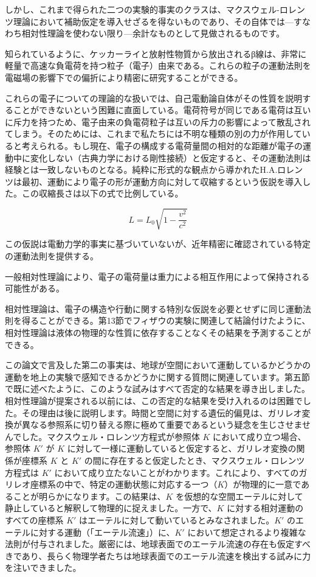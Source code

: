 \documentclass[a4paper,11pt,openany]{ltjsbook}
\begin{document}
しかし、これまで得られた二つの実験的事実のクラスは、マクスウェル-ロレンツ理論において補助仮定を導入せざるを得ないものであり、その自体では—すなわち相対性理論を使わない限り—余計なものとして見做されるものです。

知られているように、ケッカーライと放射性物質から放出されるβ線は、非常に軽量で高速な負電荷を持つ粒子（電子）由来である。これらの粒子の運動法則を電磁場の影響下での偏折により精密に研究することができる。

これらの電子についての理論的な扱いでは、自己電動論自体がその性質を説明することができないという困難に直面している。電荷符号が同じである電荷は互いに斥力を持つため、電子由来の負電荷粒子は互いの斥力の影響によって散乱されてしまう。そのためには、これまで私たちには不明な種類の別の力が作用していると考えられる。もし現在、電子の構成する電荷量間の相対的な距離が電子の運動中に変化しない（古典力学における剛性接続）と仮定すると、その運動法則は経験とは一致しないものとなる。純粋に形式的な観点から導かれたH.A.ロレンツは最初、運動により電子の形が運動方向に対して収縮するという仮説を導入した。この収縮長さは以下の式で比例している。

\[
L = L_0 \sqrt{1 - \frac{v^2}{c^2}}
\]

この仮説は電動力学的事実に基づいていないが、近年精密に確認されている特定の運動法則を提供する。

一般相対性理論により、電子の電荷量は重力による相互作用によって保持される可能性がある。

相対性理論は、電子の構造や行動に関する特別な仮説を必要とせずに同じ運動法則を得ることができる。第13節でフィザウの実験に関連して結論付けたように、相対性理論は液体の物理的な性質に依存することなくその結果を予測することができる。

この論文で言及した第二の事実は、地球が空間において運動しているかどうかの運動を地上の実験で感知できるかどうかに関する質問に関連しています。第五節で既に述べたように、このような試みはすべて否定的な結果を導き出しました。相対性理論が提案される以前には、この否定的な結果を受け入れるのは困難でした。その理由は後に説明します。時間と空間に対する遺伝的偏見は、ガリレオ変換が異なる参照系に切り替える際に極めて重要であるという疑念を生じさせませんでした。マクスウェル・ロレンツ方程式が参照体 $K$ において成り立つ場合、参照体 $K′$ が $K$ に対して一様に運動していると仮定すると、ガリレオ変換の関係が座標系 $K$ と $K′$ の間に存在すると仮定したとき、マクスウェル・ロレンツ方程式は $K′$ において成り立たないことがわかります。これにより、すべてのガリレオ座標系の中で、特定の運動状態に対応する一つ（$K$）が物理的に一意であることが明らかになります。この結果は、$K$ を仮想的な空間エーテルに対して静止していると解釈して物理的に捉えました。一方で、$K$ に対する相対運動のすべての座標系 $K′$ はエーテルに対して動いているとみなされました。$K′$ のエーテルに対する運動（「エーテル流速」）に、$K′$ において想定されるより複雑な法則が付与されました。厳密には、地球表面でのエーテル流速の存在も仮定すべきであり、長らく物理学者たちは地球表面でのエーテル流速を検出する試みに力を注いできました。
\end{document}
